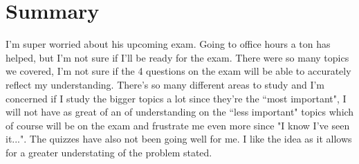 \documentclass[12pt]{article}
\begin{document}
	\section*{Summary}
	I'm super worried about his upcoming exam. Going to office hours a ton has helped, but I'm not sure if I'll be ready for the exam. There were so many topics we covered, I'm not sure if the 4 questions on the exam will be able to accurately reflect my understanding. There's so many different areas to study and I'm concerned if I study the bigger topics a lot since they're the ``most important", I will not have as great of an of understanding on the ``less important" topics which of course will be on the exam and frustrate me even more since "I know I've seen it...". The quizzes have also not been going well for me. I like the idea as it allows for a greater understating of the problem stated.
\end{document}
